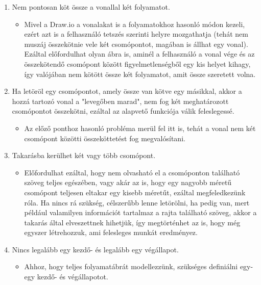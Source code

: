 \begin{enumerate}
\item Nem pontosan köt össze a vonallal két folyamatot.

\begin{itemize}
\item Mivel a Draw.io a vonalakat is a folyamatokhoz hasonló módon kezeli, ezért azt is a felhasználó tetszés szerinti helyre mozgathatja (tehát nem muszáj összekötnie vele két csomópontot, magában is állhat egy vonal). Ezáltal előfordulhat olyan ábra is, aminél a felhasználó a vonal vége és az összekötendő csomópont között figyelmetlenségből egy kis helyet kihagy, így valójában nem kötött össze két folyamatot, amit össze szeretett volna.
\end{itemize}

\item Ha letöröl egy csomópontot, amely össze van kötve egy másikkal, akkor a hozzá tartozó vonal a "levegőben marad", nem fog két meghatározott csomópontot összekötni, ezáltal az alapvető funkciója válik feleslegessé.

\begin{itemize}
\item Az előző ponthoz hasonló probléma merül fel itt is, tehát a vonal nem két csomópont közötti összeköttetést fog megvalósítani.
\end{itemize}

\item Takarásba kerülhet két vagy több csomópont.

\begin{itemize}
\item Előfordulhat ezáltal, hogy nem olvasható el a csomóponton található szöveg teljes egészében, vagy akár az is, hogy egy nagyobb méretű csomópont teljesen eltakar egy kisebb méretűt, ezáltal megfeledkezünk róla. Ha nincs rá szükség, célszerűbb lenne letörölni, ha pedig van, mert például valamilyen információt tartalmaz a rajta található szöveg, akkor a takarás által elveszettnek hihetjük, így megtörténhet az is, hogy még egyszer létrehozzuk, ami felesleges munkát eredményez.
\end{itemize}

\item Nincs legalább egy kezdő- és legalább egy végállapot.

\begin{itemize}
\item Ahhoz, hogy teljes folyamatábrát modellezzünk, szükséges definiálni egy-egy kezdő- és végállapotot.
\end{itemize}

\end{enumerate}

